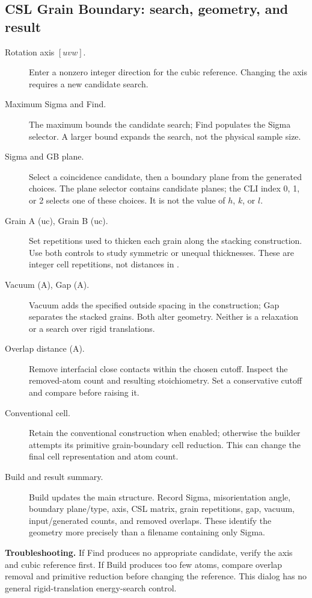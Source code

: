 \subsection{CSL Grain Boundary: search, geometry, and result}
\begin{description}
\item[{Rotation axis $[uvw]$.}] Enter a nonzero integer direction for the cubic reference. Changing the axis requires a new candidate search.
\item[Maximum Sigma and Find.] The maximum bounds the candidate search; Find populates the Sigma selector. A larger bound expands the search, not the physical sample size.
\item[Sigma and GB plane.] Select a coincidence candidate, then a boundary plane from the generated choices. The plane selector contains candidate planes; the CLI index 0, 1, or 2 selects one of these choices. It is not the value of $h$, $k$, or $l$.
\item[Grain A (uc), Grain B (uc).] Set repetitions used to thicken each grain along the stacking construction. Use both controls to study symmetric or unequal thicknesses. These are integer cell repetitions, not distances in \angstrom.
\item[Vacuum (A), Gap (A).] Vacuum adds the specified outside spacing in the construction; Gap separates the stacked grains. Both alter geometry. Neither is a relaxation or a search over rigid translations.
\item[Overlap distance (A).] Remove interfacial close contacts within the chosen cutoff. Inspect the removed-atom count and resulting stoichiometry. Set a conservative cutoff and compare before raising it.
\item[Conventional cell.] Retain the conventional construction when enabled; otherwise the builder attempts its primitive grain-boundary cell reduction. This can change the final cell representation and atom count.
\item[Build and result summary.] Build updates the main structure. Record Sigma, misorientation angle, boundary plane/type, axis, CSL matrix, grain repetitions, gap, vacuum, input/generated counts, and removed overlaps. These identify the geometry more precisely than a filename containing only Sigma.
\end{description}
\textbf{Troubleshooting.} If Find produces no appropriate candidate, verify the axis and cubic reference first. If Build produces too few atoms, compare overlap removal and primitive reduction before changing the reference. This dialog has no general rigid-translation energy-search control.

